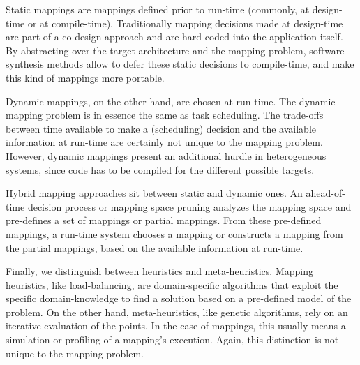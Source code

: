 Static mappings are mappings defined prior to run-time (commonly, at design-time or at compile-time).
Traditionally mapping decisions made at design-time are part of a co-design approach and are hard-coded into the application itself.
By abstracting over the target architecture and the mapping problem, software synthesis methods allow to defer these static decisions to compile-time, and make this kind of mappings more portable.

Dynamic mappings, on the other hand, are chosen at run-time.
The dynamic mapping problem is in essence the same as task scheduling.
The trade-offs between time available to make a (scheduling) decision and the available information at run-time are certainly not unique to the mapping problem.
However, dynamic mappings present an additional hurdle in heterogeneous systems, since code has to be compiled for the different possible targets.

Hybrid mapping approaches sit between static and dynamic ones. An ahead-of-time decision process or mapping space pruning analyzes the mapping space and pre-defines a set of mappings or partial mappings.
From these pre-defined mappings, a run-time system chooses a mapping or constructs a mapping from the partial mappings, based on the available information at run-time.

Finally, we distinguish between heuristics and meta-heuristics. Mapping heuristics, like load-balancing, are domain-specific algorithms that exploit the specific domain-knowledge to find a solution based on a pre-defined model of the problem.
On the other hand, meta-heuristics, like genetic algorithms, rely on an iterative evaluation of the points.
In the case of mappings, this usually means a simulation or profiling of a mapping's execution.
Again, this distinction is not unique to the mapping problem.